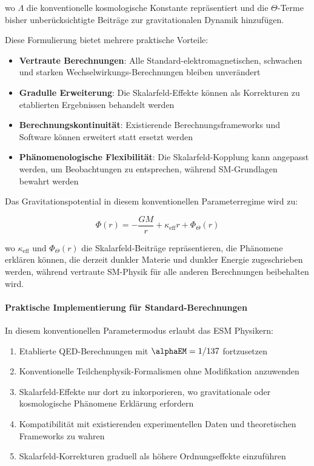	wo $\Lambda$ die konventionelle kosmologische Konstante repräsentiert und die $\Theta$-Terme bisher unberücksichtigte Beiträge zur gravitationalen Dynamik hinzufügen.
	
	Diese Formulierung bietet mehrere praktische Vorteile:
	
	\begin{itemize}
		\item \textbf{Vertraute Berechnungen}: Alle Standard-elektromagnetischen, schwachen und starken Wechselwirkungs-Berechnungen bleiben unverändert
		\item \textbf{Gradulle Erweiterung}: Die Skalarfeld-Effekte können als Korrekturen zu etablierten Ergebnissen behandelt werden
		\item \textbf{Berechnungskontinuität}: Existierende Berechnungsframeworks und Software können erweitert statt ersetzt werden
		\item \textbf{Phänomenologische Flexibilität}: Die Skalarfeld-Kopplung kann angepasst werden, um Beobachtungen zu entsprechen, während SM-Grundlagen bewahrt werden
	\end{itemize}
	
	Das Gravitationspotential in diesem konventionellen Parameterregime wird zu:
	
	\begin{equation}
		\Phi(r) = -\frac{GM}{r} + \kappa_{\text{eff}} r + \Phi_{\Theta}(r)
	\end{equation}
	
	wo $\kappa_{\text{eff}}$ und $\Phi_{\Theta}(r)$ die Skalarfeld-Beiträge repräsentieren, die Phänomene erklären können, die derzeit dunkler Materie und dunkler Energie zugeschrieben werden, während vertraute SM-Physik für alle anderen Berechnungen beibehalten wird.
	
	\paragraph{Praktische Implementierung für Standard-Berechnungen}
	\label{par:practical_implementation}
	
	In diesem konventionellen Parametermodus erlaubt das ESM Physikern:
	
	\begin{enumerate}
		\item Etablierte QED-Berechnungen mit $\alphaEM = 1/137$ fortzusetzen
		\item Konventionelle Teilchenphysik-Formalismen ohne Modifikation anzuwenden
		\item Skalarfeld-Effekte nur dort zu inkorporieren, wo gravitationale oder kosmologische Phänomene Erklärung erfordern
		\item Kompatibilität mit existierenden experimentellen Daten und theoretischen Frameworks zu wahren
		\item Skalarfeld-Korrekturen graduell als höhere Ordnungseffekte einzuführen
	\end{enumerate}
	
